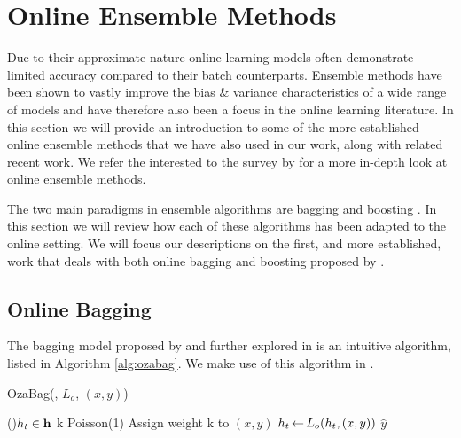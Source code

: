 \section{Online Ensemble Methods}

Due to their approximate nature online learning models often demonstrate
limited accuracy compared to their batch counterparts. Ensemble methods
have been shown to vastly improve the bias \& variance characteristics
of a wide range of models \cite{ensemble-methods-dietrich} and have therefore
also been a focus in the online learning literature.
In this section we will provide an introduction to some of the more established
online ensemble methods that we have also used in our work, along with related
recent work. We refer the interested to the survey by \citet{online-ensembles-survey}
for a more in-depth look at online ensemble methods.

The two main paradigms in ensemble algorithms are bagging \cite{bagging} and boosting \cite{boosting-freund, boosting-schapire}. In this section we will review how each of these algorithms
has been adapted to the online setting. We will focus our descriptions on the first, and more established,
work that deals with both online bagging and boosting proposed by \citet{Oza2001online}.

\subsection{Online Bagging}

The bagging model proposed by \citet{Oza2001online} and further explored in
\cite{online-bagging-experiments} is an intuitive algorithm, listed in Algorithm
\ref{alg:ozabag}. We make use of this algorithm in \uncertaintrees.

\begin{algorithm}
	\small
	\caption{OzaBag(\ensemble, $L_o$, $(x,y)$)}
	\label{alg:ozabag}

	\ForEach(){$h_t \in \mathbf{h}$}{
		k  Poisson(1) \;
		Assign weight k to $(x,y)$ \;
		$h_t {\,\leftarrow\,} L_o(h_t, (x,y))$
	}
	\Return $\widehat{y}$ \;
\end{algorithm}


